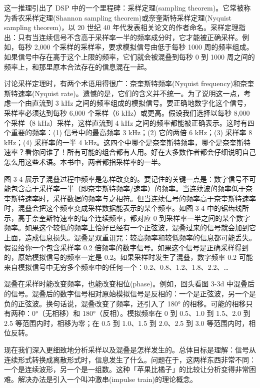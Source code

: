 这一推理引出了 DSP 中的一个里程碑：采样定理(sampling
theorem)。它常被称为香农采样定理(Shannon sampling
theorem)或奈奎斯特采样定理(Nyquist sampling theorem)，以 20 世纪 40
年代发表相关论文的作者命名。采样定理指出：只有当连续信号不含高于采样率一半的频率成分时，它才能被正确采样。例如，每秒
2,000 个采样的采样率，要求模拟信号由低于每秒 1000
周的频率组成。如果信号中存在高于这个上限的频率，它们就会被混叠到每秒 0
到 1000 周之间的频率上，和那里原本合法存在的信息混在一起。

讨论采样定理时，有两个术语用得很广：奈奎斯特频率(Nyquist
frequency)和奈奎斯特速率(Nyquist
rate)。遗憾的是，它们的含义并不统一。为了说明这一点，考虑一个由直流到 3
kHz 之间的频率组成的模拟信号。要正确地数字化这个信号，采样率必须达到每秒
6,000 个采样（6 kHz）或更高。假设我们选择以每秒 8,000 个采样（8
kHz）采样，这样直流到 4 kHz
之间的频率都能被正确表示。这时有四个重要的频率：(1) 信号中的最高频率 3
kHz；(2) 它的两倍 6 kHz；(3) 采样率 8 kHz；(4) 采样率的一半 4
kHz。这四个中哪个是奈奎斯特频率，哪个是奈奎斯特速率？看你问谁了！所有可能的组合都有人用。好在大多数作者都会仔细说明自己怎么用这些术语。本书中，两者都指采样率的一半。

图 3-4
展示了混叠过程中频率是怎样改变的。要记住的关键一点是：数字信号不可能包含高于采样率一半（即奈奎斯特频率/速率）的频率。当连续波的频率低于奈奎斯特速率时，采样数据的频率与之相符。但当连续信号的频率高于奈奎斯特速率时，混叠会把这个频率变成采样数据能表示的某个频率。如图
3-4 中的锯齿线所示，高于奈奎斯特速率的每个连续频率，都对应 0
到采样率一半之间的某个数字频率。如果这个较低的频率上恰好已经有一个正弦波，混叠过来的信号就会加到它上面，造成信息损失。混叠是双重诅咒：较高频率和较低频率的信息都可能丢失。假设给你一个包含采样率
0.2
倍频率的数字信号。如果这个信号是正确采样得到的，原始模拟信号的频率一定是
0.2。如果采样时发生了混叠，数字频率 0.2
可能来自模拟信号中无穷多个频率中的任何一个：0.2、0.8、1.2、1.8、2.2、\ldots{}

混叠在采样时能改变频率，也能改变相位(phase)。例如，回头看图 3-3d
中混叠后的信号。混叠后的数字信号相对原始模拟信号是反相的：一个是正弦波，另一个是负的正弦波。换句话说，混叠改变了频率，还引入了
180° 的相移。可能的相移只有两种：0°（无相移）和 180°（反相）。模拟频率在
0 到 0.5、1.0 到 1.5、2.0 到 2.5 等范围内时，相移为零；在 0.5 到
1.0、1.5 到 2.0、2.5 到 3.0 等范围内时，相位反转。

现在我们深入更细致地分析采样以及混叠是怎样发生的。总体目标是理解：信号从连续形式转换成离散形式时，信息发生了什么。问题在于，这两样东西非常不同：一个是连续波形，另一个是一组数。这种「苹果比橘子」的比较让分析变得非常困难。解决办法是引入一个叫冲激串(impulse
train)的理论概念。

